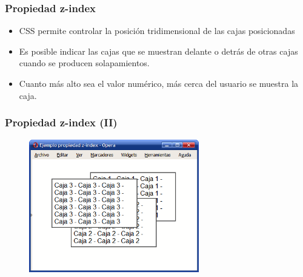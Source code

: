 
\begin{frame}
\frametitle{Propiedad z-index}

\begin{itemize}
  \item CSS permite controlar la posición tridimensional de las cajas posicionadas
  \item Es posible indicar las cajas que se muestran delante o detrás de otras cajas cuando se producen solapamientos.
  \item Cuanto más alto sea el valor numérico, más cerca del usuario se muestra la caja.
\end{itemize}

\end{frame}



\begin{frame}
\frametitle{Propiedad z-index (II)}


\begin{center}
\begin{figure}[p]
\includegraphics[width=0.66\textwidth]{figs/f0525.png}
\end{figure}
\end{center}

\end{frame}




